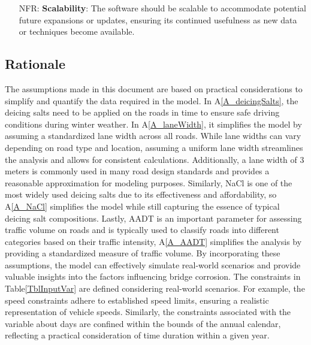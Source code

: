 \documentclass[12pt]{article}
\newcommand{\aref}[1]{A\ref{#1}}
\newcounter{nfrnum} %
\begin{document}
\begin{itemize}
\item[NFR\refstepcounter{nfrnum}\thenfrnum \label{NFR_Scalability}:]   \textbf{Scalability}: The software should be scalable to accommodate potential future expansions or updates, ensuring its continued usefulness as new data or techniques become available.

\end{itemize}

\subsection{Rationale}

The assumptions made in this document are based on practical considerations to simplify and quantify the data required in the model. In \aref{A_deicingSalts}, the deicing salts need to be applied on the roads in time to ensure safe driving conditions during winter weather. In \aref{A_laneWidth}, it simplifies the model by assuming a standardized lane width across all roads. While lane widths can vary depending on road type and location, assuming a uniform lane width streamlines the analysis and allows for consistent calculations. Additionally, a lane width of 3 meters is commonly used in many road design standards and provides a reasonable approximation for modeling purposes. Similarly, NaCl is one of the most widely used deicing salts due to its effectiveness and affordability, so \aref{A_NaCl} simplifies the model while still capturing the essence of typical deicing salt compositions. Lastly, AADT is an important parameter for assessing traffic volume on roads and is typically used to classify roads into different categories based on their traffic intensity, \aref{A_AADT} simplifies the analysis by providing a standardized measure of traffic volume. By incorporating these assumptions, the model can effectively simulate real-world scenarios and provide valuable insights into the factors influencing bridge corrosion.
The constraints in Table\ref{TblInputVar} are defined considering real-world scenarios. For example,  the speed constraints adhere to established speed limits, ensuring a realistic representation of vehicle speeds. Similarly, the constraints associated with the variable about days are confined within the bounds of the annual calendar, reflecting a practical consideration of time duration within a given year.


\end{document}
